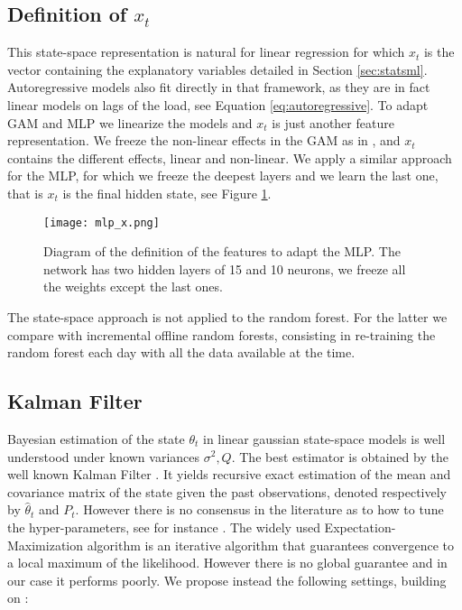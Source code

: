 \documentclass[transmag]{IEEEtran}
\begin{document}
\subsection{Definition of $x_t$}
This state-space representation is natural for linear regression for which $x_t$ is the vector containing the explanatory variables detailed in Section \ref{sec:statsml}. Autoregressive models also fit directly in that framework, as they are in fact linear models on lags of the load, see Equation \eqref{eq:autoregressive}. To adapt GAM and MLP we linearize the models and $x_t$ is just another feature representation. We freeze the non-linear effects in the GAM as in \cite{obst2021adaptive}, and $x_t$ contains the different effects, linear and non-linear. We apply a similar approach for the MLP, for which we freeze the deepest layers and we learn the last one, that is $x_t$ is the final hidden state, see Figure \ref{fig:mlp}.
\begin{figure}
    \centering
    \texttt{[image: mlp\_x.png]}
    \caption{Diagram of the definition of the features to adapt the MLP. The network has two hidden layers of 15 and 10 neurons, we freeze all the weights except the last ones.}
    \label{fig:mlp}
\end{figure}

The state-space approach is not applied to the random forest. For the latter we compare with incremental offline random forests, consisting in re-training the random forest each day with all the data available at the time.


\subsection{Kalman Filter}\label{sec:kf}
Bayesian estimation of the state $\theta_t$ in linear gaussian state-space models is well understood under known variances $\sigma^2,Q$. The best estimator is obtained by the well known Kalman Filter \cite{kalman1961new}.
It yields recursive exact estimation of the mean and covariance matrix of the state given the past observations, denoted respectively by $\hat\theta_t$ and $P_t$. However there is no consensus in the literature as to how to tune the hyper-parameters, see for instance \cite{brockwell1991time,durbin2012time,fahrmeir1992posterior}. The widely used Expectation-Maximization algorithm is an iterative algorithm that guarantees convergence to a local maximum of the likelihood. However there is no global guarantee and in our case it performs poorly. We propose instead the following settings, building on \cite{obst2021adaptive}:
\end{document}
